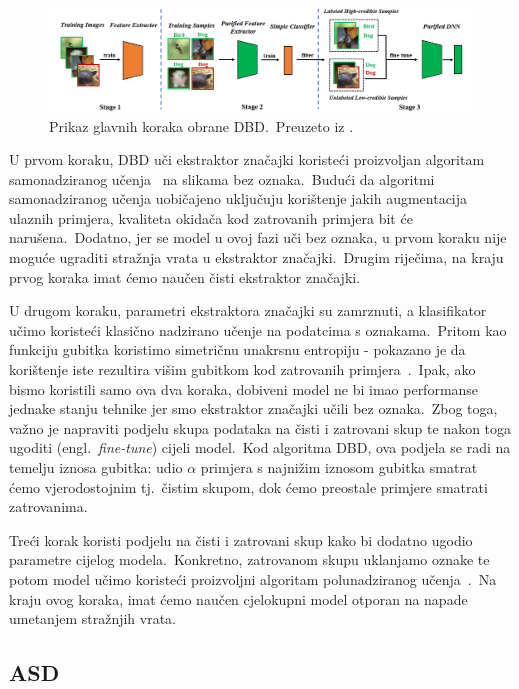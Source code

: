\documentclass[diplomskirad]{fer}
\begin{document}
\begin{figure}[h]
  \centering
  \includegraphics[scale=0.65]{./Slike/dbd.png}
  \caption{Prikaz glavnih koraka obrane DBD.\ Preuzeto iz \cite{huang2022backdoor}.}
  \label{fig:dbd}
\end{figure}
  
U prvom koraku, DBD uči ekstraktor značajki koristeći proizvoljan algoritam samonadziranog učenja~\cite{jaiswal2020survey} na slikama bez oznaka.\ 
Budući da algoritmi samonadziranog učenja uobičajeno uključuju korištenje jakih augmentacija ulaznih primjera, kvaliteta okidača kod zatrovanih primjera bit će narušena.\ 
Dodatno, jer se model u ovoj fazi uči bez oznaka, u prvom koraku nije moguće ugraditi stražnja vrata u ekstraktor značajki.\ Drugim riječima, na kraju prvog koraka imat ćemo naučen čisti ekstraktor značajki.\ 

U drugom koraku, parametri ekstraktora značajki su zamrznuti, a klasifikator učimo koristeći klasično nadzirano učenje na podatcima s oznakama.\ 
Pritom kao funkciju gubitka koristimo simetričnu unakrsnu entropiju - pokazano je da korištenje iste rezultira višim gubitkom kod zatrovanih primjera~\cite{wang2019symmetric}.\ 
Ipak, ako bismo koristili samo ova dva koraka, dobiveni model ne bi imao performanse jednake stanju tehnike jer smo ekstraktor značajki učili bez oznaka.\ 
Zbog toga, važno je napraviti podjelu skupa podataka na čisti i zatrovani skup te nakon toga ugoditi (engl.\ \textit{fine-tune}) cijeli model.\ 
Kod algoritma DBD, ova podjela se radi na temelju iznosa gubitka: udio $\alpha$ primjera s najnižim iznosom gubitka smatrat ćemo vjerodostojnim tj.\ čistim skupom, dok ćemo preostale primjere smatrati zatrovanima.\ 

Treći korak koristi podjelu na čisti i zatrovani skup kako bi dodatno ugodio parametre cijelog modela.\ 
Konkretno, zatrovanom skupu uklanjamo oznake te potom model učimo koristeći proizvoljni algoritam polunadziranog učenja~\cite{van2020survey}.\ 
Na kraju ovog koraka, imat ćemo naučen cjelokupni model otporan na napade umetanjem stražnjih vrata.\ 

\pagebreak

\subsection{ASD}
\label{sub:asd}
\end{document}
